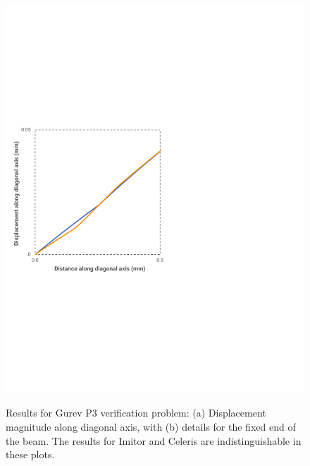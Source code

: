 \begin{figure}[ht!]
{		\includegraphics[scale=0.45]{media/5-verif/2-gurev3/gurev3-2.pdf}
\label{fig:gure3-2}}		
%
\caption{Results for Gurev P3 verification problem: (a) Displacement magnitude along diagonal axis, with (b) details for the fixed end of the beam. The results for Imitor and Celeris are indistinguishable in these plots.}
\label{fig:gurev3}
\end{figure}

